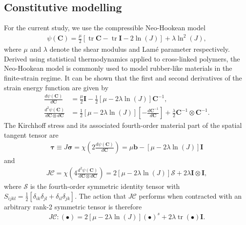 \documentclass[AMA,STIX1COL]{WileyNJD-v2}
\DeclareMathOperator{\trace}{tr}
\begin{document}
\subsection{Constitutive modelling
\label{sec: Constitutive modelling}
}

For the current study, we use the compressible Neo-Hookean model
\begin{gather}
\psi \left( \mathbf{C} \right)
  = \frac{\mu}{2} \left[ \trace{\mathbf{C}} - \trace{\mathbf{I}} - 2 \ln\left( J \right) \right]
  + \lambda \ln^{2}\left( J \right) ,
\label{eq:neo_hookean_energy}
\end{gather}
where $\mu$ and $\lambda$ denote the shear modulus and Lam\'{e} parameter respectively.
Derived using statistical thermodynamics applied to cross-linked polymers,
the Neo-Hookean model \cite{Treloar1975a,Treloar1976a} is commonly used to model rubber-like materials in the finite-strain regime.
It can be shown that the first and second derivatives of the strain energy function are given by
\begin{align}
\frac{d \psi \left( \mathbf{C} \right)}{d \mathbf{C}}
  &= \frac{\mu}{2} \mathbf{I} - \frac{1}{2} \left[ \mu - 2\lambda\ln\left( J \right) \right] \mathbf{C}^{-1} ,\\
\frac{d^{2} \psi \left( \mathbf{C} \right)}{d \mathbf{C} \otimes d \mathbf{C}}
  &= \frac{1}{2}\left[ \mu - 2\lambda\ln\left( J \right) \right] \left[ - \frac{d \mathbf{C}^{-1}}{d \mathbf{C}} \right]
  + \frac{\lambda}{2} \mathbf{C}^{-1} \otimes \mathbf{C}^{-1} .
\end{align}
The Kirchhoff stress and its associated fourth-order material part of the spatial tangent tensor are
\begin{gather}
\boldsymbol{\tau}
  \equiv J \boldsymbol{\sigma}
  = \chi\left( 2 \frac{d \psi \left( \mathbf{C} \right)}{d \mathbf{C}} \right)
  = \mu \mathbf{b} - \left[ \mu - 2\lambda\ln\left( J \right) \right] \mathbf{I}
\end{gather}
and
\begin{gather}
J \boldsymbol{\mathcal{C}}
  = \chi\left( 4 \frac{d^{2} \psi \left( \mathbf{C} \right)}{d \mathbf{C} \otimes d \mathbf{C}} \right)
  = 2 \left[ \mu - 2\lambda\ln\left( J \right) \right] \boldsymbol{\mathcal{S}}
  + 2 \lambda \mathbf{I} \otimes \mathbf{I} ,
\end{gather}
where $\boldsymbol{\mathcal{S}}$ is the fourth-order symmetric identity tensor
with $S_{ijkl}=\frac{1}{2}\left[\delta_{ik}\delta_{jl}+\delta_{il}\delta_{jk}\right]$.
The action that $J \boldsymbol{\mathcal{C}}$ performs when contracted with an arbitrary rank-2 symmetric tensor is therefore
\begin{gather}
J \boldsymbol{\mathcal{C}} : \left( \bullet \right)
  = 2 \left[ \mu - 2\lambda\ln\left( J \right) \right] \left( \bullet \right)^s
  + 2 \lambda \trace\left( \bullet \right) \mathbf{I}.
\label{eq:simplified_action}
\end{gather}
\end{document}
